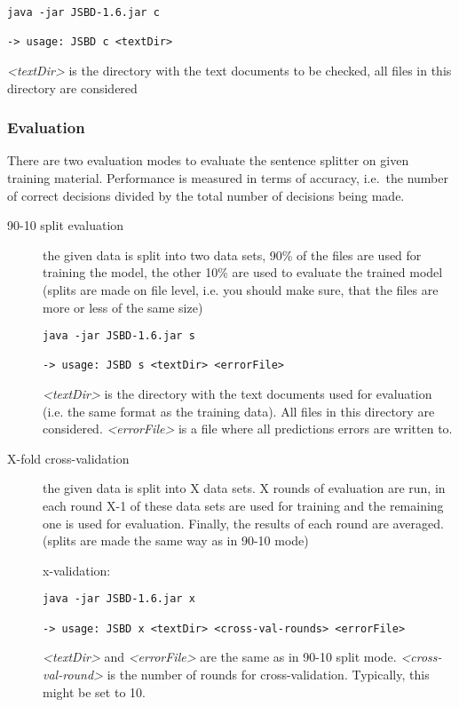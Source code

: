 \documentclass[11pt,a4paper,halfparskip]{scrartcl}
\begin{document}
\begin{verbatim}
java -jar JSBD-1.6.jar c

-> usage: JSBD c <textDir>
\end{verbatim}

\textit{<textDir>} is the directory with the text documents to be
checked, all files in this directory are considered


\subsubsection{Evaluation}

There are two evaluation modes to evaluate the sentence splitter on
given training material. Performance is measured in terms of accuracy, i.e.\
the number of correct decisions divided by the total number of
decisions being made.

\begin{description}
\item [90-10 split evaluation] the given data is split into two data
  sets, 90\% of the files are used for training the model, the other
  10\% are used to evaluate the trained model (splits are made on file
  level, i.e. you should make sure, that the files are more or less of
  the same size)

\begin{verbatim}
java -jar JSBD-1.6.jar s

-> usage: JSBD s <textDir> <errorFile>
\end{verbatim}

\textit{<textDir>} is the directory with the text documents used for
evaluation (i.e. the same format as the training data). All files in
this directory are considered. \textit{<errorFile>} is a file where
all predictions errors are written to.


\item[X-fold cross-validation] the given data is split into X data
  sets. X rounds of evaluation are run, in each round X-1 of these data
  sets are used for training and the remaining one is used for
  evaluation. Finally, the results of each round are averaged. (splits
  are made the same way as in 90-10 mode)

x-validation:
\begin{verbatim}
java -jar JSBD-1.6.jar x

-> usage: JSBD x <textDir> <cross-val-rounds> <errorFile>
\end{verbatim}

\textit{<textDir>} and \textit{<errorFile>} are the same as in 90-10
split mode. \textit{<cross-val-round>} is the number of rounds for
cross-validation. Typically, this might be set to 10.

\end{description}
\end{document}
